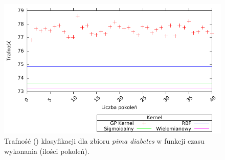 	\begin{figure}
		\includegraphics[scale=0.90]{figures/results/accuracy/accuracy-pima-diabetes}
		\caption{Trafność () klasyfikacji dla zbioru \emph{pima diabetes} w funkcji czasu wykonania (ilości pokoleń).\label{fig:acc-pima}}
	\end{figure} 

%	
%	



%	
%	
	


